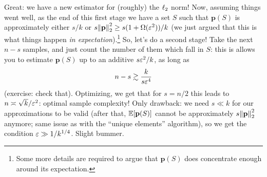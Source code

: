 \documentclass[10pt]{article}
\newcommand{\dst}{\eps}
\newcommand{\ab}{k}
\newcommand{\ns}{n}
\newcommand{\p}{\mathbf{p}}
\begin{document}
Great: we have a new estimator for (roughly) the $\lp[2]$ norm! Now, assuming things went well, as the end of this first stage we have a set $S$ such that $\p(S)$ is approximately either $s/\ab$ or $s\normtwo{\p}^2\geq s(1+\Omega(\dst^2))/\ab$ (we just argued that this is what things happen \emph{in expectation}).\footnote{Some more details are required to argue that $\p(S)$ does concentrate enough around its expectation.} So, let's do a second stage! Take the next $\ns-s$ samples, and just count the number of them which fall in $S$: this is allows you to estimate $\p(S)$  up to an additive $s\dst^2/\ab$, as long as
\[
      \ns - s \gtrsim \frac{\ab}{s\dst^4}
\]
(exercise: check that). Optimizing, we get that for $s=\ns/2$ this leads to $\ns \asymp \sqrt{\ab}/\dst^2$: optimal sample complexity! Only drawback: we need $s\ll \ab$ for our approximations to be valid (after that, $\expect{\p(S)}$ cannot be approximately $s\normtwo{\p}^2$ anymore; same issue as with the ``unique elements'' algorithm), so we get the condition $\dst \gg 1/\ab^{1/4}$. Slight bummer.
\end{document}
